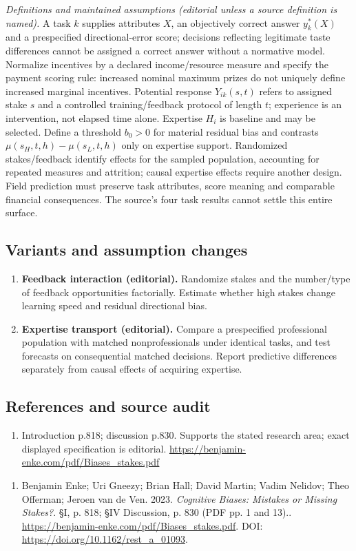 \documentclass[11pt,a4paper]{article}
\begin{document}
\emph{Definitions and maintained assumptions (editorial unless a source definition is named).} A task \(k\) supplies attributes \(X\), an objectively correct answer \(y_k^*(X)\) and a prespecified directional-error score; decisions reflecting legitimate taste differences cannot be assigned a correct answer without a normative model. Normalize incentives by a declared income/resource measure and specify the payment scoring rule: increased nominal maximum prizes do not uniquely define increased marginal incentives. Potential response \(Y_{ik}(s,t)\) refers to assigned stake \(s\) and a controlled training/feedback protocol of length \(t\); experience is an intervention, not elapsed time alone. Expertise \(H_i\) is baseline and may be selected. Define a threshold \(b_0>0\) for material residual bias and contrasts \(\mu(s_H,t,h)-\mu(s_L,t,h)\) only on expertise support. Randomized stakes/feedback identify effects for the sampled population, accounting for repeated measures and attrition; causal expertise effects require another design. Field prediction must preserve task attributes, score meaning and comparable financial consequences. The source’s four task results cannot settle this entire surface.
\subsection*{Variants and assumption changes}
\begin{enumerate}
\item \textbf{Feedback interaction (editorial).} Randomize stakes and the number/type of feedback opportunities factorially. Estimate whether high stakes change learning speed and residual directional bias.
\item \textbf{Expertise transport (editorial).} Compare a prespecified professional population with matched nonprofessionals under identical tasks, and test forecasts on consequential matched decisions. Report predictive differences separately from causal effects of acquiring expertise.
\end{enumerate}
\subsection*{References and source audit}
\begin{enumerate}
\item Introduction p.818; discussion p.830. Supports the stated research area; exact displayed specification is editorial. \url{https://benjamin-enke.com/pdf/Biases_stakes.pdf}
\end{enumerate}
\begin{enumerate}\raggedright
\item\hypertarget{definitions:source:30007584:1}{} Benjamin Enke; Uri Gneezy; Brian Hall; David Martin; Vadim Nelidov; Theo Offerman; Jeroen van de Ven. 2023. \emph{Cognitive Biases: Mistakes or Missing Stakes?}. §I, p. 818; §IV Discussion, p. 830 (PDF pp. 1 and 13)..
\url{https://benjamin-enke.com/pdf/Biases_stakes.pdf}.
DOI: \url{https://doi.org/10.1162/rest_a_01093}.
\end{enumerate}
\end{document}
